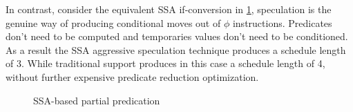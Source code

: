In contrast, consider the equivalent SSA if-conversion in \ref{fig:nest_ssa}, speculation is the genuine way of producing conditional moves out of $\phi$ instructions. Predicates don't need to be computed and temporaries values don't need to be conditioned. As a result the SSA aggressive speculation technique produces a schedule length of 3. While traditional support produces in this case a schedule length of 4, without further expensive predicate reduction optimization.

\begin{figure}
\centering
\caption{SSA-based partial predication}
\label{fig:nest_ssa}
\end{figure}

